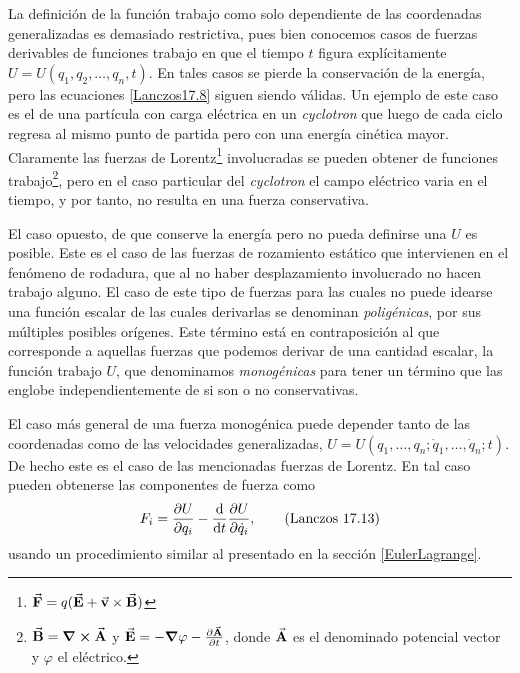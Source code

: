 \documentclass[12pt, spanish, a4paper, ]{article}
\begin{document}
La definición de la función trabajo como solo dependiente de las coordenadas generalizadas es demasiado restrictiva, pues bien conocemos casos de fuerzas derivables de funciones trabajo en que el tiempo \(t\) figura explícitamente \(U= U(q_1, q_2, \ldots, q_n,t)\).
En tales casos se pierde la conservación de la energía, pero las ecuaciones \eqref{Lanczos17.8} siguen siendo válidas.
Un ejemplo de este caso es el de una partícula con carga eléctrica en un \emph{cyclotron} que luego de cada ciclo regresa al mismo punto de partida pero con una energía cinética mayor.
Claramente las fuerzas de Lorentz\footnote{\(\va{F}= q (\va{E}+ \va{v}\times \va{B})\)} involucradas se pueden obtener de funciones trabajo\footnote{\(\va{B}= \curl{\va{A}}\) y \(\va{E}= -\grad \varphi - \pdv{\va{A}}{t}\), donde \(\va{A}\) es el denominado potencial vector y \(\varphi\) el eléctrico.}, pero en el caso particular del \emph{cyclotron} el campo eléctrico varia en el tiempo, y por tanto, no resulta en una fuerza conservativa.

El caso opuesto, de que conserve la energía pero no pueda definirse una \(U\) es posible.
Este es el caso de las fuerzas de rozamiento estático que intervienen en el fenómeno de rodadura, que al no haber desplazamiento involucrado no hacen trabajo alguno.
El caso de este tipo de fuerzas para las cuales no puede idearse una función escalar de las cuales derivarlas se denominan \emph{poligénicas}, por sus múltiples posibles orígenes.
Este término está en contraposición al que corresponde a aquellas fuerzas que podemos derivar de una cantidad escalar, la función trabajo \(U\), que denominamos \emph{monogénicas} para tener un término que las englobe independientemente de si son o no conservativas.

El caso más general de una fuerza monogénica puede depender tanto de las coordenadas como de las velocidades generalizadas, \(U= U(q_1, \ldots, q_n; \dot{q}_1, \ldots, \dot{q}_n; t)\).
De hecho este es el caso de las mencionadas fuerzas de Lorentz.
En tal caso pueden obtenerse las componentes de fuerza como
\begin{equation}\label{Lanczos17.13}
	F_i= \pdv{U}{q_i}- \dv{t} \pdv{U}{\dot{q}_i},
	\tag{Lanczos 17.13}
\end{equation}
usando un procedimiento similar al presentado en la sección \ref{EulerLagrange}.


\end{document}
